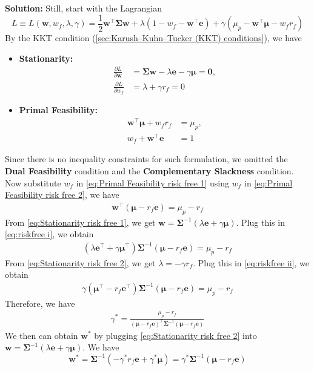 \documentclass[13pt]{article}
\theoremstyle{definition}
\newenvironment{solution}
{\color{C2}\begin{framed}\begingroup\textbf{Solution:} }
  {\endgroup\end{framed}}
\theoremstyle{remark}
\newenvironment{remark}
  {\pushQED{\qed}\renewcommand{\qedsymbol}{$\triangle$}\remarkx}
  {\popQED\endremarkx}
\begin{document}
\begin{solution} Still, start with the Lagrangian
\[
L\equiv L(\bm{w}, w_f, \lambda, \gamma) = \frac{1}{2} \bm{w}^{\top} \mathbf{\Sigma} \bm{w}+\lambda(1-w_f-\bm{w}^{\top} \bm{e})+\gamma(\mu_p-\bm{w}^{\top}\bm{\mu}-w_f r_f)
\]
By the KKT condition (\cref{sec:Karush–Kuhn–Tucker (KKT) conditions}), we have
\begin{itemize}
    \item \textbf{Stationarity:} 
    \begin{align}
        \frac{\partial L}{\partial \bm{w}}&=\mathbf{\Sigma} \bm{w}-\lambda \bm{e}-\gamma \bm{\mu}=\bm{0},\label{eq:Stationarity risk free 1}\\
        \frac{\partial L}{\partial w_f}&=\lambda +\gamma r_f=0\label{eq:Stationarity risk free 2}
    \end{align}
    
    \item \textbf{Primal Feasibility:}
    \begin{align}
        \bm{w}^{\top}\bm{\mu}+w_f r_{f} &=\mu_p, \label{eq:Primal Feasibility risk free 1}\\  w_f+\bm{w}^{\top} \bm{e}&=1\label{eq:Primal Feasibility risk free 2}
    \end{align}
\end{itemize}
\begin{remark}
    Since there is no inequality constraints for such formulation, we omitted the \textbf{Dual Feasibility} condition and the \textbf{Complementary Slackness} condition. 
\end{remark}    
Now substitute $w_f$ in \cref{eq:Primal Feasibility risk free 1} using $w_f$ in \cref{eq:Primal Feasibility risk free 2}, we have
\begin{align}
    \bm{w}^{\top}(\bm{\mu}- r_f\bm{e}) =\mu_p-r_f \label{eq:riskfree i}
\end{align}
From \cref{eq:Stationarity risk free 1}, we get $\bm{w}=\mathbf{\Sigma}^{-1}(\lambda \bm{e}+\gamma \bm{\mu})$. Plug this in \cref{eq:riskfree i}, we obtain
\begin{align}
    (\lambda \bm{e}^\top+\gamma \bm{\mu}^\top)\mathbf{\Sigma}^{-1}(\bm{\mu}- r_f\bm{e}) =\mu_p-r_f \label{eq:riskfree ii}
\end{align}
From \cref{eq:Stationarity risk free 2}, we get $\lambda=-\gamma r_f$. Plug this in \cref{eq:riskfree ii}, we obtain
\begin{align}
    \gamma( \bm{\mu}^\top- r_f \bm{e}^\top)\mathbf{\Sigma}^{-1}(\bm{\mu}- r_f\bm{e}) =\mu_p-r_f \label{eq:riskfree iii}
\end{align}
Therefore, we have
\begin{align}
    \gamma^*=\frac{\mu_p-r_{f}}{\left(\bm{\mu}-r_{f} \bm{e}\right)^{\top} \mathbf{\Sigma}^{-1}\left(\bm{\mu}-r_{f} \bm{e}\right)} \label{eq:riskfree gamma}
\end{align}
We then can obtain $\bm{w}^*$ by plugging \cref{eq:Stationarity risk free 2} into $\bm{w}=\mathbf{\Sigma}^{-1}(\lambda \bm{e}+\gamma \bm{\mu})$. We have
\[
\bm{w}^*=\mathbf{\Sigma}^{-1}(-\gamma^* r_f \bm{e}+\gamma^* \bm{\mu}) = \gamma^*\mathbf{\Sigma}^{-1}(\bm{\mu}- r_f \bm{e})
\]


\end{solution}
\end{document}
